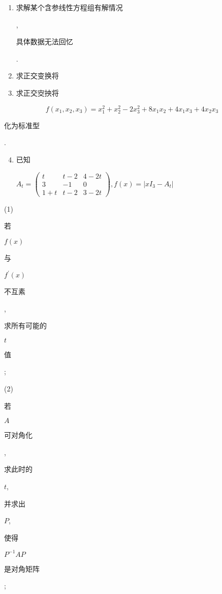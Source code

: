 \documentclass[10pt]{article}
\begin{document}
\begin{enumerate}
  \item \begin{CJK}{UTF8}{mj}求解某个含参线性方程组有解情况\end{CJK}, \begin{CJK}{UTF8}{mj}具体数据无法回忆\end{CJK}.

  \item \begin{CJK}{UTF8}{mj}求正交变换将\end{CJK}

  \item \begin{CJK}{UTF8}{mj}求正交㝔抰将\end{CJK}

\end{enumerate}
$$
f\left(x_{1}, x_{2}, x_{3}\right)=x_{1}^{2}+x_{2}^{2}-2 x_{3}^{2}+8 x_{1} x_{2}+4 x_{1} x_{3}+4 x_{2} x_{3}
$$
\begin{CJK}{UTF8}{mj}化为标准型\end{CJK}.

\begin{enumerate}
  \setcounter{enumi}{3}
  \item \begin{CJK}{UTF8}{mj}已知\end{CJK} $A_{t}=\left(\begin{array}{ccc}t & t-2 & 4-2 t \\ 3 & -1 & 0 \\ 1+t & t-2 & 3-2 t\end{array}\right), f(x)=\left|x I_{3}-A_{t}\right|$
\end{enumerate}
(1) \begin{CJK}{UTF8}{mj}若\end{CJK} $f(x)$ \begin{CJK}{UTF8}{mj}与\end{CJK} $f^{\prime}(x)$ \begin{CJK}{UTF8}{mj}不互素\end{CJK}, \begin{CJK}{UTF8}{mj}求所有可能的\end{CJK} $t$ \begin{CJK}{UTF8}{mj}值\end{CJK};

(2) \begin{CJK}{UTF8}{mj}若\end{CJK} $A$ \begin{CJK}{UTF8}{mj}可对角化\end{CJK}, \begin{CJK}{UTF8}{mj}求此时的\end{CJK} $t$, \begin{CJK}{UTF8}{mj}并求出\end{CJK} $P$, \begin{CJK}{UTF8}{mj}使得\end{CJK} $P^{-1} A P$ \begin{CJK}{UTF8}{mj}是对角矩阵\end{CJK};
\end{document}
